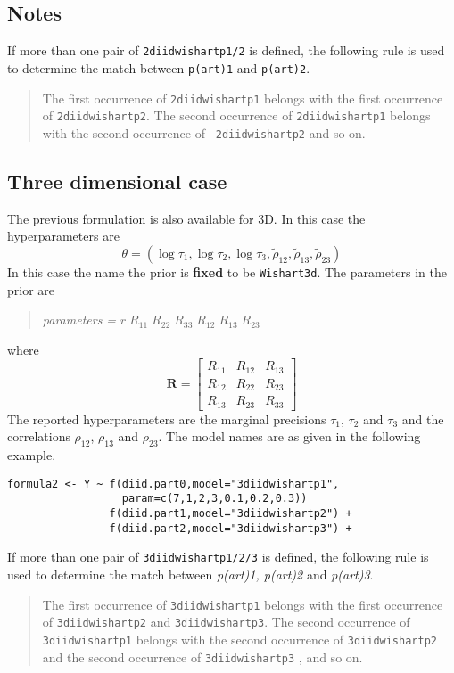 \documentclass[a4paper,11pt]{article}
\begin{document}
\subsection*{Notes}
If more than one pair of {\tt 2diidwishartp1/2} is defined, the
following rule is used to determine the match between {\tt p(art)1}
and {\tt p(art)2}.
\begin{quote}
    The first occurrence of {\tt 2diidwishartp1} belongs with the
    first occurrence of {\tt 2diidwishartp2}.  The second occurrence
    of {\tt 2diidwishartp1} belongs with the second occurrence of {\tt
        2diidwishartp2} and so on.
\end{quote}


\subsection*{Three dimensional case}


The previous formulation is also available for 3D. In this case the
hyperparameters are
\begin{displaymath}
    \theta = (\log \tau_{1}, \log \tau_{2}, \log \tau_{3},
    \tilde\rho_{12},
    \tilde\rho_{13},
    \tilde\rho_{23})
\end{displaymath}
In this case the
name the prior is \textbf{fixed} to be \texttt{Wishart3d}. The
parameters in the prior are
\begin{quote}
    \emph{parameters = } $r\;R_{11}\;R_{22}\;R_{33}\; R_{12}\;
    R_{13}\; R_{23}$
\end{quote}
where
\begin{displaymath}
    \mathbf{R} =
    \left[\begin{array}{ccc}
        R_{11} &R_{12} & R_{13}\\
        R_{12} & R_{22} & R_{23}\\
        R_{13} & R_{23} & R_{33}
    \end{array}\right]
\end{displaymath}
The reported hyperparameters are the marginal precisions $\tau_{1}$,
$\tau_{2}$ and $\tau_{3}$ and the correlations $\rho_{12}$,
$\rho_{13}$ and $\rho_{23}$. The model names are as given in the
following example.
\begin{verbatim}
formula2 <- Y ~ f(diid.part0,model="3diidwishartp1",
                  param=c(7,1,2,3,0.1,0.2,0.3))
                f(diid.part1,model="3diidwishartp2") +
                f(diid.part2,model="3diidwishartp3") +
\end{verbatim}

If more than one pair of {\tt 3diidwishartp1/2/3} is defined, the
following rule is used to determine the match between \emph{p(art)1,
    p(art)2} and \emph{p(art)3}.
\begin{quote}
    The first occurrence of {\tt 3diidwishartp1} belongs with the
    first occurrence of {\tt 3diidwishartp2} and {\tt 3diidwishartp3}.
    The second occurrence of {\tt 3diidwishartp1} belongs with the
    second occurrence of {\tt 3diidwishartp2} and the second
    occurrence of {\tt 3diidwishartp3} , and so on.
\end{quote}
\end{document}

